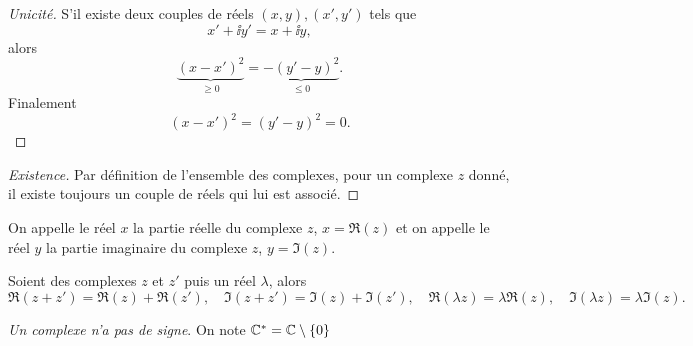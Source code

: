 \begin{proof}[Unicité]
    S'il existe deux couples de réels \((x,y),(x',y')\) tels que
    \begin{equation}
        x'+\ii y'=x +\ii y,
    \end{equation}
    alors
    \begin{equation}
        \underbrace{(x-x')^2}_{\geqslant 0}=\underbrace{-(y'-y)^2}_{\leqslant 0}.
    \end{equation}
    Finalement
    \begin{equation}
        (x-x')^2=(y'-y)^2=0.
    \end{equation}
\end{proof}
\begin{proof}[Existence]
    Par définition de l'ensemble des complexes, pour un complexe \(z\) donné, il 
    existe toujours un couple de réels qui lui est associé.
\end{proof}
On appelle le réel \(x\) la partie réelle du complexe \(z\), \(x=\Re(z)\) et on 
appelle le réel \(y\) la partie imaginaire du complexe \(z\), \(y=\Im(z)\).
\begin{prop}
    Soient des complexes \(z\) et \(z'\) puis un réel \(\lambda\), alors
    \begin{equation}
        \Re(z+z')=\Re(z)+\Re(z'), \quad \Im(z+z')=\Im(z)+\Im(z'), \quad 
        \Re(\lambda z)=\lambda \Re(z), \quad \Im(\lambda z)=\lambda \Im(z).
    \end{equation}
\end{prop}
\emph{Un complexe n'a pas de signe}. On note \(\mathbb{C}^*=\mathbb{C} \setminus \{0\}\)
